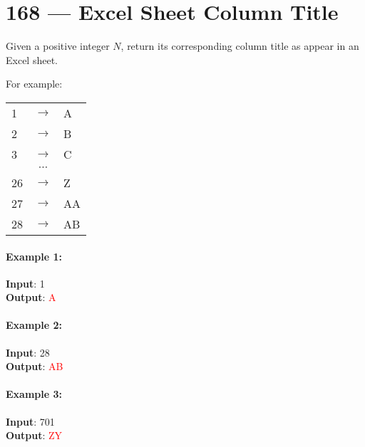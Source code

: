 \section{168 --- Excel Sheet Column Title}
Given a positive integer $N$, return its corresponding column title as appear in an Excel sheet.
\par
For example:
\begin{table}[H]
\begin{tabular}{lcl}
1 & $\to$ & A \\
2 & $\to$ & B \\
3 & $\to$ & C \\
 & $\cdots$ & \\
26 & $\to$ & Z  \\
27 & $\to$ &AA  \\
28 & $\to$ &AB  
\end{tabular}
\end{table}
\paragraph{Example 1:}
\begin{flushleft}
\textbf{Input}: 1
\\
\textbf{Output}: \textcolor{red}{A}
\end{flushleft}
\paragraph{Example 2:}
\begin{flushleft}
\textbf{Input}: 28
\\
\textbf{Output}: \textcolor{red}{AB}
\end{flushleft}
\paragraph{Example 3:}
\begin{flushleft}
\textbf{Input}: 701
\\
\textbf{Output}: \textcolor{red}{ZY}
\end{flushleft}
